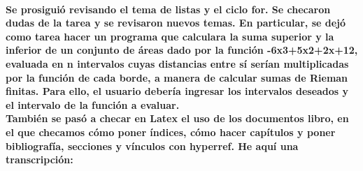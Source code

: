 \documentclass{book}
\begin{document}
	\paragraph{Se prosiguió revisando el tema de listas y el ciclo for. Se checaron dudas de la tarea y se revisaron nuevos temas. En particular, se dejó como tarea hacer un programa que calculara la suma superior y la inferior de un conjunto de áreas dado por la función -6x3+5x2+2x+12, evaluada en n intervalos cuyas distancias entre sí serían multiplicadas por la función de cada borde, a manera de calcular sumas de Rieman finitas. Para ello, el usuario debería ingresar los intervalos deseados y el intervalo de la función a evaluar.\\También se pasó a checar en Latex el uso de los documentos libro, en el que checamos cómo poner índices, cómo hacer capítulos y poner bibliografía, secciones y vínculos con hyperref. He aquí una transcripción:}
\end{document}
